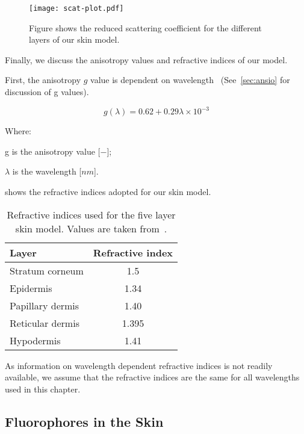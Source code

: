 \begin{figure}[!htpb]
	\centering
	\texttt{[image: scat-plot.pdf]}
	\caption{Figure shows the reduced scattering coefficient for the different layers of our skin model.}
	\label{fig:scatplot}
\end{figure}

\FloatBarrier

Finally, we discuss the anisotropy values and refractive indices of our model.

First, the anisotropy $g$ value is dependent on wavelength~\cite{louisethesis,van1989skin} (See~\cref{sec:ansio} for discussion of g values).

\begin{equation}
g(\lambda)=0.62+0.29\lambda\times10^{-3}
\end{equation}

\noindent Where:

\indent g is the anisotropy value [$-$];

\indent $\lambda$ is the wavelength [$nm$].

\medskip

 shows the refractive indices adopted for our skin model.

\begin{table}[!htpb]
  \centering

  \begin{tabular}{l|c}
  \hline
  Layer & Refractive index \\
  \hline
    Stratum corneum & 1.5 \\
    Epidermis &  1.34\\
    Papillary dermis & 1.40 \\
    Reticular dermis &  1.395\\
    Hypodermis &  1.41\\

  \hline
  \end{tabular}
    \caption{Refractive indices used for the five layer skin model. Values are taken from~\cite{meglinski2002quantitative}.}
  \label{tab:refindex}
\end{table}

As information on wavelength dependent refractive indices is not readily available, we assume that the refractive indices are the same for all wavelengths used in this chapter.

\subsection{Fluorophores in the Skin}


